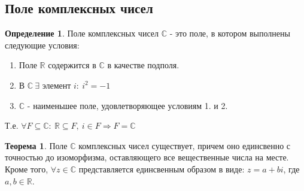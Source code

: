 \documentclass[a4paper, 12pt]{article}
\newcommand{\R}{\mathbb R}
\theoremstyle{definition}
\newtheorem*{definition}{Определение}
\newtheorem*{theorem}{Теорема}
\begin{document}
  \subsection{Поле комплексных чисел}
  \begin{definition}
    Поле комплексных чисел $\mathbb{C} $ - это поле, в котором выполнены следующие условия:
    \begin{enumerate}
      \item Поле $\R$ содержится в $\mathbb{C} $ в качестве подполя.
      \item В $\mathbb{C} \ \exists$ элемент $i:\  i^2 = -1$
      \item $\mathbb{C} $ - наименьшее поле, удовлетворяющее условиям 1. и 2.     
    \end{enumerate}
    Т.е. $\forall F\subseteq \mathbb{C}: \ \R \subseteq F, \ i\in F \Longrightarrow  F = \mathbb{C}$ 
  \end{definition} 
  \begin{theorem}
    Поле $\mathbb{C}$ комплексных чисел существует, причем оно единсвенно с точностью до изоморфизма, оставляющего все вещественные числа на месте. Кроме того, $\forall z \in \mathbb{C}$ представляется единсвенным образом в виде: $z = a + bi$, где $a, b \in \R$.
  \end{theorem} 
\end{document}
